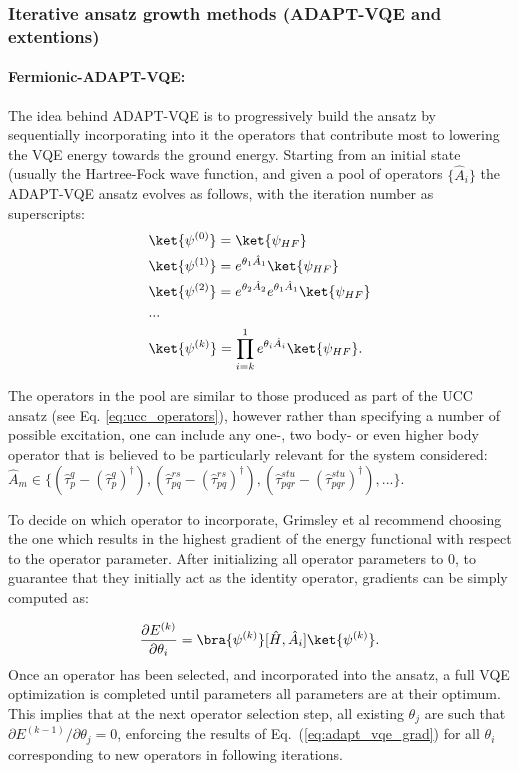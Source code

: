 \subsubsection{Iterative ansatz growth methods (ADAPT-VQE and extentions)} \label{sec:adapt-vqe}

\paragraph{Fermionic-ADAPT-VQE:} The idea behind ADAPT-VQE \cite{Grimsley2019} is to progressively build the ansatz by sequentially incorporating into it the operators that contribute most to lowering the VQE energy towards the ground energy. Starting from an initial state (usually the Hartree-Fock wave function, and given a pool of operators $\{\hat{A}_i \}$ the ADAPT-VQE ansatz evolves as follows, with the iteration number as superscripts:
\begin{align} \label{eq:adapt-vqe}
    &\ket{\psi^{(0)}} = \ket{\psi_{HF}} \nonumber \\
    &\ket{\psi^{(1)}} = e^{\theta_1\hat{A}_1}\ket{\psi_{HF}} \nonumber \\
    &\ket{\psi^{(2)}} = e^{\theta_2\hat{A}_2}e^{\theta_1\hat{A}_1}\ket{\psi_{HF}} \nonumber \\
    &... \nonumber \\
    &\ket{\psi^{(k)}} = \prod^1_{i=k} e^{\theta_i\hat{A}_i}\ket{\psi_{HF}}.
\end{align}

The operators in the pool are similar to those produced as part of the UCC ansatz (see Eq. \ref{eq:ucc_operators}), however rather than specifying a number of possible excitation, one can include any one-, two body- or even higher body operator that is believed to be particularly relevant for the system considered: $\hat{A}_m \in \{ (\hat{\tau}_p^q - (\hat{\tau}_{p}^{q})^{\dagger}), (\hat{\tau}_{pq}^{rs} - (\hat{\tau}_{pq}^{rs})^{\dagger}), (\hat{\tau}_{pqr}^{stu} - (\hat{\tau}_{pqr}^{stu})^{\dagger}), ... \} $.

To decide on which operator to incorporate, Grimsley et al \cite{Grimsley2019} recommend choosing the one which results in the highest gradient of the energy functional with respect to the operator parameter. After initializing all operator parameters to $0$, to guarantee that they initially act as the identity operator, gradients can be simply computed as:

\begin{equation} \label{eq:adapt_vqe_grad}
    \frac{\partial E^{(k)}}{\partial \theta_i} = \bra{\psi^{(k)}} [ \hat{H}, \hat{A}_i] \ket{\psi^{(k)}}.
\end{equation}
Once an operator has been selected, and incorporated into the ansatz, a full VQE optimization is completed until parameters all parameters are at their optimum. This implies that at the next operator selection step, all existing $\theta_j$ are such that $\partial E^{(k - 1)}/\partial \theta_j = 0$, enforcing the results of Eq.~(\ref{eq:adapt_vqe_grad}) for all $\theta_i$ corresponding to new operators in following iterations.

